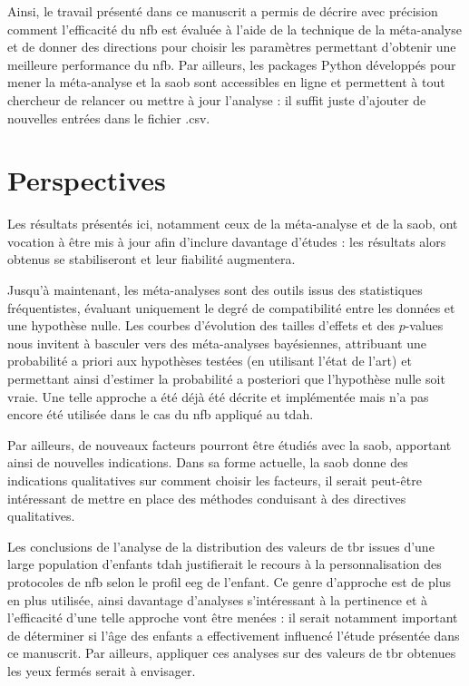 Ainsi, le travail présenté dans ce manuscrit a permis de décrire avec précision comment l'efficacité du \gls{nfb} est évaluée à l'aide de la technique de la méta-analyse et de donner des 
directions pour choisir les paramètres permettant d'obtenir une meilleure performance du \gls{nfb}. Par ailleurs, les packages Python développés pour mener la méta-analyse et la \gls{saob}
sont accessibles en ligne et permettent à tout chercheur de relancer ou mettre à jour l'analyse : il suffit juste d'ajouter de nouvelles entrées dans le fichier .csv.


\section{Perspectives}

Les résultats présentés ici, notamment ceux de la méta-analyse et de la \gls{saob}, ont vocation à être mis à jour afin d'inclure davantage d'études : les résultats alors obtenus se 
stabiliseront et leur fiabilité augmentera.   

Jusqu'à maintenant, les méta-analyses sont des outils issus des statistiques fréquentistes,
évaluant uniquement le degré de compatibilité entre les données et une hypothèse nulle.
Les courbes d'évolution des tailles d'effets et des $p$-values nous invitent à basculer vers des méta-analyses bayésiennes,
attribuant une probabilité a priori aux hypothèses testées (en utilisant l'état de l'art) et permettant ainsi d'estimer la probabilité a posteriori que l'hypothèse nulle soit vraie.
Une telle approche a été déjà été décrite et implémentée \citep{Dormuth2016, Spiegelhalter2004} mais n'a pas encore été utilisée dans le cas du \gls{nfb} appliqué au \gls{tdah}.  

Par ailleurs, de nouveaux facteurs pourront être étudiés avec la \gls{saob}, apportant ainsi de nouvelles  
indications. Dans sa forme actuelle, la \gls{saob} donne des indications qualitatives sur comment choisir les facteurs, il serait peut-être intéressant de mettre en place des
méthodes conduisant à des directives qualitatives.

Les conclusions de l'analyse de la distribution des valeurs de \gls{tbr} issues d'une large population d'enfants \gls{tdah} justifierait le recours à la 
personnalisation des protocoles de \gls{nfb} selon le profil \gls{eeg} de l'enfant. Ce genre d'approche est de plus en plus utilisée, ainsi davantage d'analyses s'intéressant
à la pertinence et à l'efficacité d'une telle approche vont être menées : il serait notamment important de déterminer si l'âge des enfants a effectivement influencé l'étude
présentée dans ce manuscrit. Par ailleurs, appliquer ces analyses sur des valeurs de \gls{tbr} obtenues les yeux fermés serait à envisager. 

